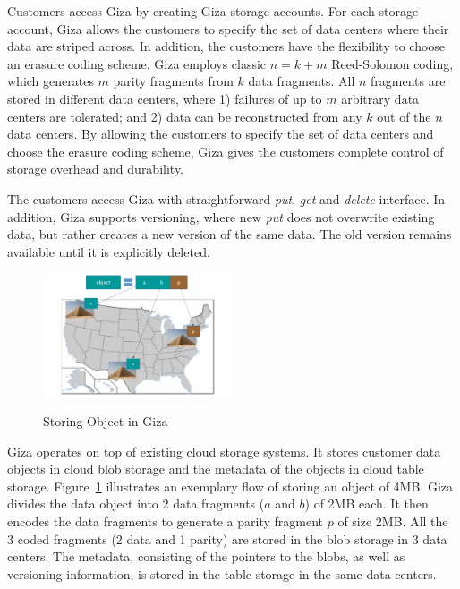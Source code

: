 Customers access Giza by creating Giza storage accounts. For each storage account, Giza allows the customers to specify the set of data centers where their data are striped across. In addition, the customers have the flexibility to choose an erasure coding scheme. Giza employs classic $n = k + m$ Reed-Solomon coding, which generates $m$ parity fragments from $k$ data fragments. All $n$ fragments are stored in different data centers, where 1) failures of up to $m$ arbitrary data centers are tolerated; and 2) data can be reconstructed from any $k$ out of the $n$ data centers. By allowing the customers to specify the set of data centers and choose the erasure coding scheme, Giza gives the customers complete control of storage overhead and durability.

The customers access Giza with straightforward {\em put}, {\em get} and {\em delete} interface. In addition, Giza supports versioning, where new {\em put} does not overwrite existing data, but rather creates a new version of the same data. The old version remains available until it is explicitly deleted.

\begin{figure}[tp]
\centering
\includegraphics[width=0.5\textwidth]{images/giza_example_crop_fit}
\label{fig:giza_example}
\caption{Storing Object in Giza}
\end{figure}

Giza operates on top of existing cloud storage systems. It stores customer data objects in cloud blob storage and the metadata of the objects in cloud table storage.
Figure~\ref{fig:giza_example} illustrates an exemplary flow of storing an object of 4MB.
Giza divides the data object into $2$ data fragments ($a$ and $b$) of 2MB each. It then encodes the data fragments to generate a parity fragment $p$ of size 2MB. All the $3$ coded fragments (2 data and 1 parity) are stored in the blob storage in 3 data centers. The metadata, consisting of the pointers to the blobs, as well as versioning information, is stored in the table storage in the same data centers.

